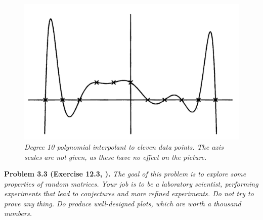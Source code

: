 \documentclass[a4paper,oneside]{book}
\numberwithin{equation}{chapter}
\begin{document}
\begin{figure}[H]
	\centering
	\includegraphics[scale=0.35]{7}
	\caption{\textit{Degree 10 polynomial interpolant to eleven data points. The axis scales are not given, as these have no effect on the picture.}}
\end{figure}
\textbf{Problem 3.3 (Exercise 12.3, \cite{1}).} \textit{The goal of this problem is to explore some properties of random matrices. Your job is to be a laboratory scientist, performing experiments that lead to conjectures and more refined experiments. Do not try to prove any thing. Do produce well-designed plots, which are worth a thousand numbers.}
\end{document}
